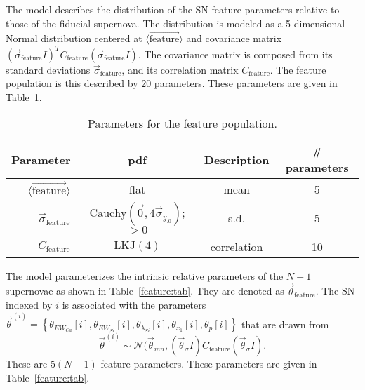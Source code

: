 \documentclass{aastex61}   	%
\begin{document}
The model describes the distribution of the SN-feature parameters relative to those of the fiducial supernova.  The distribution is modeled as a
5-dimensional Normal distribution
centered at $\langle \overrightarrow{\text{feature}}\rangle$ and covariance
matrix
$(\vec{\sigma}_{\text{feature}}I)^T C_{\text{feature}}  (\vec{\sigma}_{\text{feature}}I)$.  The covariance matrix is composed from
its standard deviations $\vec{\sigma}_{\text{feature}}$,
and its correlation matrix $C_{\text{feature}}$.
The feature population is this described by $20$ parameters.  These parameters are given in Table~\ref{population:tab}.
\begin{table}
\begin{center}
\caption{Parameters for the feature population. \label{population:tab}}
\begin{tabular}{rccc}
\hline
Parameter & pdf & Description & \# parameters\\ \hline
$\langle \overrightarrow{\text{feature}}\rangle$ & flat  &  mean & 5\\
$\vec{\sigma}_{\text{feature}}$ & $\text{Cauchy}(\vec{0},4\vec{\sigma}_{y_{.0}})$; $>0$  &  s.d. & 5\\
$C_{\text{feature}}$ & $\text{LKJ}(4)$ &  correlation & 10\\
\hline
\end{tabular}
\end{center}
\end{table}

The model parameterizes the intrinsic relative parameters of the $N-1$ supernovae as shown in Table~\ref{feature:tab}.
They are denoted as $\vec{\theta}_{\mathrm{feature}}$.
The SN indexed by $i$ is associated with the parameters
$\vec{\theta}^{(i)}=\left\{\theta_{EW_{Ca}}[i], \theta_{EW_{Si}}[i], \theta_{\lambda_{Si}}[i], \theta_{x_1}[i], \theta_{p}[i] \right\}$
that are drawn from
\begin{equation}
\vec{\theta}^{(i)} \sim \mathcal{N}(\vec{\theta}_{\mathit{mn}}, (\vec{\theta}_{\sigma}I) C_{\text{feature}}  (\vec{\theta}_{\sigma}I).
\label{feature:pdf}
\end{equation}
These are $5(N-1)$ feature parameters. These parameters are given in Table~\ref{feature:tab}.
\end{document}
